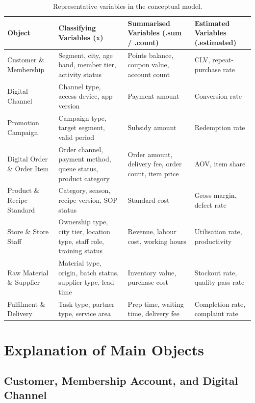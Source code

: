 \documentclass[12pt,a4paper]{article}
\renewcommand{\arraystretch}{1.28}
\begin{document}
\begin{table}[H]
\centering
\scriptsize
\renewcommand{\arraystretch}{1.16}
\caption{Representative variables in the conceptual model.}
\begin{tabularx}{\textwidth}{P{3.0cm}Y Y Y}
\toprule
\textbf{Object} & \textbf{Classifying Variables (x)} & \textbf{Summarised Variables (.sum / .count)} & \textbf{Estimated Variables (.estimated)} \\
\midrule
Customer \& Membership & Segment, city, age band, member tier, activity status & Points balance, coupon value, account count & CLV, repeat-purchase rate \\
Digital Channel & Channel type, access device, app version & Payment amount & Conversion rate \\
Promotion Campaign & Campaign type, target segment, valid period & Subsidy amount & Redemption rate \\
Digital Order \& Order Item & Order channel, payment method, queue status, product category & Order amount, delivery fee, order count, item price & AOV, item share \\
Product \& Recipe Standard & Category, season, recipe version, SOP status & Standard cost & Gross margin, defect rate \\
Store \& Store Staff & Ownership type, city tier, location type, staff role, training status & Revenue, labour cost, working hours & Utilisation rate, productivity \\
Raw Material \& Supplier & Material type, origin, batch status, supplier type, lead time & Inventory value, purchase cost & Stockout rate, quality-pass rate \\
Fulfilment \& Delivery & Task type, partner type, service area & Prep time, waiting time, delivery fee & Completion rate, complaint rate \\
\bottomrule
\end{tabularx}
\end{table}

\section{Explanation of Main Objects}

\subsection{Customer, Membership Account, and Digital Channel}
\end{document}

